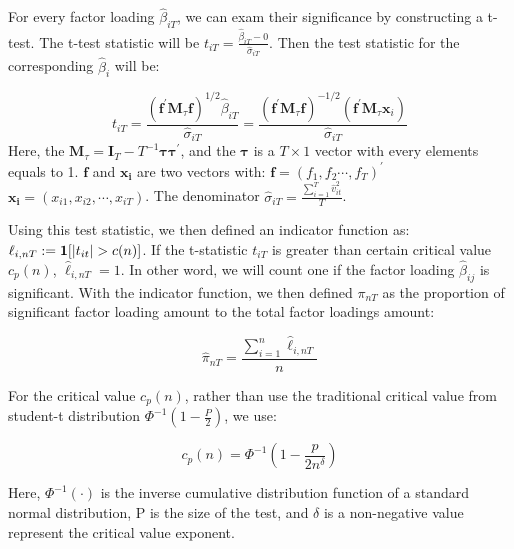 \documentclass[12pt]{article}
\begin{document}
For every factor loading $\hat{\beta}_{iT}$, we can exam their significance by constructing a t-test.
The t-test statistic will be $t_{iT} = \frac{\hat{\beta}_{iT} - 0}{\hat{\sigma}_{iT}}$.  
Then the test statistic for the corresponding $\hat{\beta}_i$ will be:

\[t_{i T}=\frac{\left(\mathbf{f}^{\prime} \mathbf{M}_{\tau} \mathbf{f}\right)^{1 / 2} \hat{\beta}_{i T}}{\hat{\sigma}_{i T}}=\frac{\left(\mathbf{f}^{\prime} \mathbf{M}_{\tau} \mathbf{f}\right)^{-1 / 2}\left(\mathbf{f}^{\prime} \mathbf{M}_{\tau} \mathbf{x}_{i}\right)}{\hat{\sigma}_{i T}}\]
Here, the $\mathbf{M}_{\tau} = \mathbf{I}_T - T^{-1}\mathbf{\tau}\mathbf{\tau^\prime}$, and the $\mathbf{\tau}$ is a $T\times 1$ vector with every elements equals to 1.
$\mathbf{f}$ and $\mathbf{x_i}$ are two vectors with: $\mathbf{f} = (f_1, f_2 \cdots, f_T)^{\prime}$   $\mathbf{x_i} = (x_{i1}, x_{i2}, \cdots, x_{iT})$.
The denominator $\hat{\sigma}_{iT} = \frac{\sum_{i=1}^{T} \hat{v}^2_{it} }{T}$.

Using this test statistic, we then defined an  indicator function as: $\ell_{i,nT} := {\bf1}[|t_{it}|>c(n)]$.
If the t-statistic $t_{iT}$ is greater than certain critical value $c_p(n)$,  $\hat{\ell}_{i,nT} = 1$. 
In other word, we will count one if the factor loading $\hat{\beta}_{ij}$ is significant. 
With the indicator function, we then defined $\pi_{nT}$ as the proportion of significant factor loading amount to the total factor loadings amount:

\[  \hat{\pi}_{nT} = \frac{\sum_{i=1}^n \hat{\ell}_{i,nT}}{n} \tag{3} \label{pi_function} \]


For the critical value $c_p(n)$, rather than use the traditional critical value from student-t distribution $\Phi^{-1}(1-\frac{P}{2})$, we use:

\[   c_p(n) = \Phi^{-1}(1 - \frac{p}{2n^\delta})   \tag{4} \label{critical_value_function} \]

Here, $\Phi^{-1}(\cdot)$ is the inverse cumulative distribution function of a standard normal distribution, P is the size of the test, and $\delta$ is a non-negative value represent the critical value exponent. 
\end{document}
